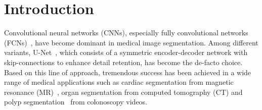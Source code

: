\documentclass[runningheads]{llncs}
\begin{document}

%
%
%
\section{Introduction}
Convolutional neural networks (CNNs), especially fully convolutional networks (FCNs)~\cite{long2015fully}, have become dominant in medical image segmentation. Among different variants, U-Net~\cite{ronneberger2015u}, which consists of a symmetric encoder-decoder network with skip-connections to enhance detail retention, has become the de-facto choice.
Based on this line of approach, tremendous success has been achieved in a wide range of medical applications such as cardiac segmentation from magnetic resonance (MR)~\cite{yu2017automatic}, organ segmentation from computed tomography (CT) \cite{zhou2017fixed,li2018h,yu2018recurrent} and polyp segmentation~\cite{zhou2018unet++} from colonoscopy videos.
\end{document}
